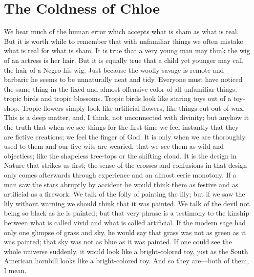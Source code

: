 \documentclass{book}
\begin{document}
\chapter{The Coldness of Chloe}
\label{chapter-23}
We hear much of the human error which accepts what is sham as what is real. But it is worth while to remember that with unfamiliar things we often mistake what is real for what is sham. It is true that a very young man may think the wig of an actress is her hair. But it is equally true that a child yet younger may call the hair of a Negro his wig. Just because the woolly savage is remote and barbaric he seems to be unnaturally neat and tidy. Everyone must have noticed the same thing in the fixed and almost offensive color of all unfamiliar things, tropic birds and tropic blossoms. Tropic birds look like staring toys out of a toy-shop. Tropic flowers simply look like artificial flowers, like things cut out of wax. This is a deep matter, and, I think, not unconnected with divinity; but anyhow it the truth that when we see things for the first time we feel instantly that they are fictive creations; we feel the finger of God. It is only when we are thoroughly used to them and our five wits are wearied, that we see them as wild and objectless; like the shapeless tree-tops or the shifting cloud. It is the design in Nature that strikes us first; the sense of the crosses and confusions in that design only comes afterwards through experience and an almost eerie monotony. If a man saw the stars abruptly by accident he would think them as festive and as artificial as a firework. We talk of the folly of painting the lily; but if we saw the lily without warning we should think that it was painted. We talk of the devil not being so black as he is painted; but that very phrase is a testimony to the kinship between what is called vivid and what is called artificial. If the modern sage had only one glimpse of grass and sky, he would say that grass was not as green as it was painted; that sky was not as blue as it was painted. If one could see the whole universe suddenly, it would look like a bright-colored toy, just as the South American hornbill looks like a bright-colored toy. And so they are—both of them, I mean.
\end{document}
